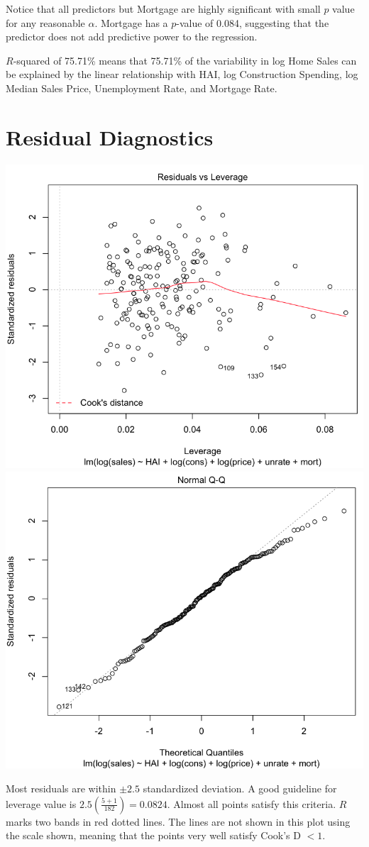 \documentclass[a4 paper, 11 pt]{article}
\begin{document}
Notice that all predictors but Mortgage are highly significant with small $p$ value for any reasonable $\alpha$. Mortgage has a $p$-value of 0.084, suggesting that the predictor does not add predictive power to the regression.

$R$-squared of 75.71\% means that 75.71\% of the variability in log Home Sales can be explained by the linear relationship with HAI, log Construction Spending, log Median Sales Price, Unemployment Rate, and Mortgage Rate.

\section{Residual Diagnostics}
\begin{center}
\includegraphics[scale=0.4]{diag}
\includegraphics[scale=0.4]{QQ}
\end{center}
Most residuals are within $\pm 2.5$ standardized deviation. A good guideline for leverage value is $2.5 \left(\frac{5+1}{182}\right) = 0.0824$. Almost all points satisfy this criteria. $R$ marks two bands in red dotted lines. The lines are not shown in this plot using the scale shown, meaning that the points very well satisfy Cook's D $<1$.
\end{document}
